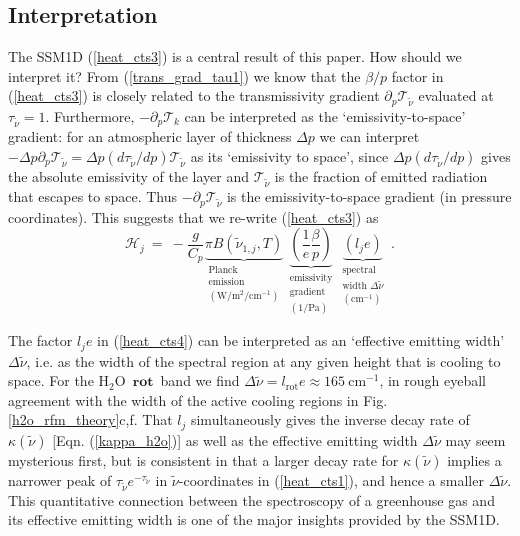 \documentclass{ametsoc}
\newcommand{\beqn}{\begin{equation}}
\newcommand{\eeqn}{\end{equation}}
\newcommand{\eqnref}[1]{(\ref{#1})}
\newcommand{\Wmsq}{\ensuremath{\mathrm{W/m^2}}}
\newcommand{\cminverse}{\ensuremath{\mathrm{cm^{-1}}}}
\newcommand{\Pa}{\ensuremath{\mathrm{Pa}}}
\newcommand{\ppp}{\ensuremath{\partial_p}}
\newcommand{\Cp}{\ensuremath{C_p}}
\newcommand{\htwo}{\ensuremath{\mathrm{H_2O}}}
\newcommand{\wv}{\ensuremath{\widetilde{\nu}}}
\newcommand{\trans}{\ensuremath{\mathcal{T}}}
\newcommand{\ch}{\ensuremath{\mathcal{H}}}
\newcommand{\lj}{\ensuremath{l_j}}
\newcommand{\tauk}{\ensuremath{\tau_{\wv}}}
\newcommand{\konej}{\ensuremath{\wv_{1,j}}}
\newcommand{\lrot}{\ensuremath{l_\mathrm{rot}}}
\newcommand{\rot}{\ensuremath{\textbf{rot}}}
\begin{document}
\subsection{Interpretation} \label{sec_interp}
The SSM1D  \eqnref{heat_cts3} is a central result of this paper. How should we interpret it? From \eqnref{trans_grad_tau1} we know that the $\beta/p$ factor in \eqnref{heat_cts3} is closely related to the transmissivity gradient $\ppp \trans_{\wv}$ evaluated at $\tauk=1$. Furthermore, $-\ppp \trans_k$ can be interpreted as  the `emissivity-to-space' gradient: for an atmospheric layer of thickness $\Delta p$ we can interpret $-\Delta p\ppp \trans_{\wv}  = \Delta p (d \tauk/dp)\trans_{\wv}$ as its `emissivity to space', since $\Delta p(d \tauk/dp)$ gives the absolute  emissivity of the layer and $\trans_{\wv}$ is the fraction of emitted radiation that escapes to space. Thus $-\ppp \trans_{\wv}$ is the emissivity-to-space gradient (in pressure coordinates). This suggests that we re-write \eqnref{heat_cts3} as 
	\beqn
		\ch_j \ = \ -\frac{g}{\Cp} \underbrace{\pi B(\konej,T)}_{\substack{ \text{Planck } \\ \text{emission}\\(\Wmsq/\cminverse)}}\,
					   \underbrace{\left(\frac{1}{e}\frac{\beta}{p}\right)}_{\substack{ \text{emissivity} \\ \text{gradient}  \\ (1/\Pa) } } \,
					   \underbrace{(\lj e)}_{\substack{  \text{spectral} \\ \text{width $\Delta \wv$} \\ (\cminverse) } }    \; .
		\label{heat_cts4}
	\eeqn

The factor $\lj e$ in \eqnref{heat_cts4} can be interpreted as an `effective emitting width' $\Delta \wv$, i.e. as the  width of the spectral region at any given height that is cooling to space. For the \htwo\ \rot\ band we find $\Delta \wv = \lrot e \approx  165\ \cminverse$,  in rough eyeball agreement with the width of the active cooling regions in Fig. \ref{h2o_rfm_theory}c,f. That $\lj$ simultaneously gives the inverse decay rate of $\kappa(\wv)$ [Eqn. \eqnref{kappa_h2o}] as well as the effective emitting width $\Delta \wv$ may seem mysterious first, but is consistent in that a larger decay rate for $\kappa(\wv)$ implies a narrower peak of $\tauk e^{-\tauk}$ in \wv-coordinates in \eqnref{heat_cts1}, and hence a smaller $\Delta \wv$. This quantitative connection between the spectroscopy of a greenhouse gas and its effective emitting width is one of the major insights provided by the SSM1D.
\end{document}
